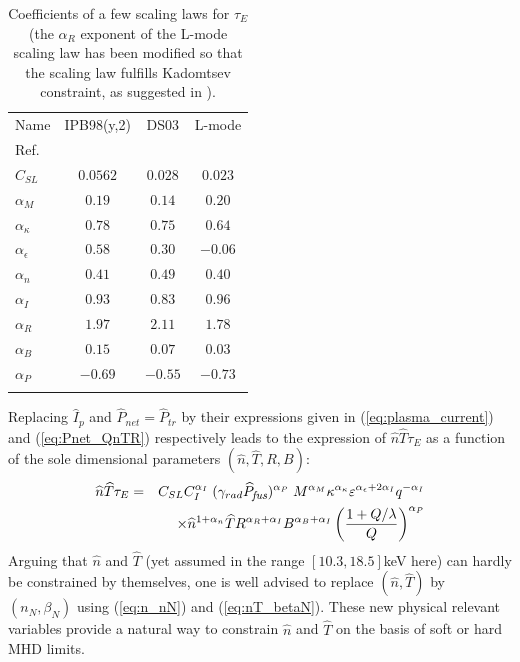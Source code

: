 \documentclass[12pt]{iopart}
\newcommand{\hatPfus}{{\widehat{P}_{\textrm{\it\footnotesize fus}}}}
\begin{document}
\begin{table}
	\caption{\label{Tab:scaling_law_coef} Coefficients of a few scaling laws for $\tau_E$ (the $\alpha_R$ exponent of the L-mode scaling law has been modified so that the scaling law fulfills Kadomtsev constraint, as suggested in \cite[p.2206]{ITERphysics_chap2}).}
	\begin{indented}
		\item[]\begin{tabular}{@{}lccc}
			\br
			Name & IPB98(y,2) & DS03 & L-mode
			\\ 
			Ref. & \cite[eq.(20)]{ITERphysics_chap2} & \cite{Sips2018} & \cite[eq.(24)]{ITERphysics_chap2}
			\\ \br
			$C_{SL}$ & $0.0562$ & $0.028$ & $0.023$ \\ \mr
			$\alpha_M$ & $0.19$ & $0.14$ & $0.20$ \\ \mr
			$\alpha_\kappa$ & $0.78$ & $0.75$ & $0.64$ \\ \mr 
			$\alpha_\epsilon$ & $0.58$ & $0.30$ & $-0.06$ \\ \mr
			$\alpha_n$ & $0.41$ & $0.49$ & $0.40$ \\ \mr 
			$\alpha_I$ & $0.93$ & $0.83$ & $0.96$ \\ \mr 
			$\alpha_R$ & $1.97$ & $2.11$ & $1.78$ \\ \mr 
			$\alpha_B$ & $0.15$ & $0.07$ & $0.03$ \\ \mr 
			$\alpha_P$ & $-0.69$ & $-0.55$ & $-0.73$ \\ \br
		\end{tabular}
	\end{indented}
\end{table}
Replacing $\widehat I_p$ and $\widehat P_{net} = \widehat P_{tr}$ by their expressions given in (\ref{eq:plasma_current}) and (\ref{eq:Pnet_QnTR}) respectively leads to the expression of $\widehat n \widehat T \tau_E$ as a function of the sole dimensional parameters $(\widehat n, \widehat T, R, B)$:
\begin{eqnarray}
 \widehat n \widehat T \tau_E &=& C_{SL} C_I^{\alpha_I}\; 
(\gamma_{rad} \hatPfus)^{\alpha_P}\;
M^{\alpha_M} \kappa^{\alpha_\kappa} \varepsilon^{\alpha_\epsilon + 2\alpha_I} q^{-\alpha_I} \nonumber \\
 && \times \widehat n^{1+\alpha_n} \widehat T 
 R^{\alpha_R+\alpha_I} B^{\alpha_B+\alpha_I} 
 \left( \frac{1+Q/\lambda}{Q} \right)^{\alpha_P}
 \label{eq:nTtau_nTRB}
\end{eqnarray}
Arguing that $\widehat n$ and $\widehat T$ (yet assumed in the range $[10.3, 18.5]$keV here) can hardly be constrained by themselves, one is well advised to replace $(\widehat n, \widehat T)$ by $(n_N, \beta_N)$ using (\ref{eq:n_nN}) and (\ref{eq:nT_betaN}). These new physical relevant variables provide a natural way to constrain $\widehat n$ and $\widehat T$ on the basis of soft or hard MHD limits. 
\end{document}
